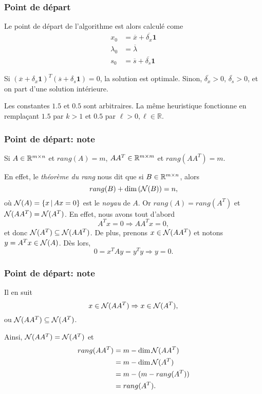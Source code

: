 \documentclass[usepdftitle=false, aspectratio=169]{beamer}
\def\bone{\boldsymbol{1}}
\begin{document}
\begin{frame}
\frametitle{Point de départ}

Le point de départ de l'algorithme est alors calculé come
\begin{align*}
x_0 &= \overline{x} + \overline{\delta_x} \bone \\
\lambda_0 &= \overline{\lambda} \\
s_0 &= \overline{s} + \overline{\delta_s} \bone
\end{align*}

\mbox{}

Si $(\overline{x} + \delta_x \bone)^T(\overline{s} + \delta_s \bone) = 0$, la solution est optimale.
Sinon, $\overline{\delta_x} > 0$, $\overline{\delta_s} > 0$, et on part d'une solution intérieure.

\mbox{}

Les constantes $1.5$ et $0.5$ sont arbitraires. La même heuristique fonctionne en remplaçant $1.5$ par $k > 1$ et $0.5$ par $\ell > 0, \ell \in \mathbb{R}$.

\end{frame}

\begin{frame}
\frametitle{Point de départ: note}

Si $A \in {\mathbb{R}}^{m \times n}$ et $rang(A) = m$, $AA^T \in {\mathbb{R}}^{m \times m}$ et $rang(AA^T) = m$.

\mbox{}

En effet, le \textit{théorème du rang} nous dit que si $B \in {\mathbb{R}}^{m \times n}$, alors
$$
rang(B) + \dim \left( {\mathcal{N}}(B) \right) = n,
$$
où ${\mathcal{N}}(A) = \{ x \,|\, Ax = 0 \}$ est le \textit{noyau} de $A$. Or $rang(A) = rang(A^T)$ et ${\mathcal{N}}(AA^T) = {\mathcal{N}}(A^T)$. En effet, nous avons tout d'abord
$$
A^Tx = 0 \Rightarrow AA^Tx = 0,
$$
et donc ${\mathcal{N}}(A^T) \subseteq {\mathcal{N}}(AA^T)$. De plus, prenons $x \in {\mathcal{N}}(AA^T)$ et notons $y = A^Tx \in {\mathcal{N}}(A)$. Dès lors,
$$
0 = x^TAy = y^Ty \Rightarrow y = 0.
$$

\end{frame}

\begin{frame}
\frametitle{Point de départ: note}

Il en suit
$$
x \in {\mathcal{N}}(AA^T) \Rightarrow x \in {\mathcal{N}}(A^T),
$$
ou ${\mathcal{N}}(AA^T) \subseteq {\mathcal{N}}(A^T)$.

\mbox{}

Ainsi, ${\mathcal{N}}(AA^T) = {\mathcal{N}}(A^T)$ et
\begin{align*}
rang(AA^T) &= m - \dim{\mathcal{N}}(AA^T) \\ &= m - \dim{\mathcal{N}}(A^T) \\ &= m - (m - rang(A^T)) \\ & = rang(A^T).
\end{align*}

\end{frame}
\end{document}
